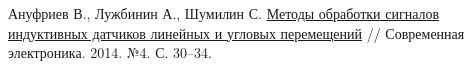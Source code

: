 \newpage
{} %


\begin{thebibliography}{9}
    Ануфриев В., Лужбинин А., Шумилин С. 
    \href{https://www.milandr.ru/upload/iblock/4bf/4bf1c97fcce296a450d7b68bb0fc65b0.pdf}{Методы обработки сигналов индуктивных датчиков линейных и угловых перемещений} // Современная электроника. 2014. №4. С. 30–34.
\end{thebibliography}